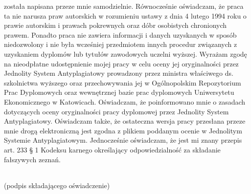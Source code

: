 \vspace{0.1cm}
\noindent\dotfill

\noindent\thesistitlepl

\noindent\dotfill

\noindent została napisana przeze mnie samodzielnie.
Równocześnie oświadczam, że praca ta nie narusza praw autorskich w rozumieniu ustawy z dnia 4 lutego 1994 roku o prawie autorskim i prawach pokrewnych oraz dóbr osobistych chronionych prawem.
Ponadto praca nie zawiera informacji i danych uzyskanych w sposób niedozwolony i nie była wcześniej przedmiotem innych procedur związanych z uzyskaniem dyplomów lub tytułów zawodowych uczelni wyższej.
Wyrażam zgodę na nieodpłatne udostępnienie mojej pracy w celu oceny jej oryginalności przez Jednolity System Antyplagiatowy prowadzony przez ministra właściwego ds. szkolnictwa wyższego oraz przechowywania jej w Ogólnopolskim Repozytorium Prac Dyplomowych oraz wewnętrznej bazie prac dyplomowych Uniwersytetu Ekonomicznego w Katowicach. Oświadczam, że poinformowano mnie o zasadach dotyczących oceny oryginalności pracy dyplomowej przez Jednolity System Antyplagiatowy.
Oświadczam także, że ostateczna wersja pracy przesłana przeze mnie drogą elektroniczną jest zgodna z plikiem poddanym ocenie w Jednolitym Systemie Antyplagiatowym.
Jednocześnie oświadczam, że jest mi znany przepis art. 233 § 1 Kodeksu karnego określający odpowiedzialność za składanie fałszywych zeznań.

\begin{flushright}
\makebox[0.52\textwidth]{\dotfill} \\
(podpis składającego oświadczenie)
\end{flushright}
\endgroup


\tableofcontents


